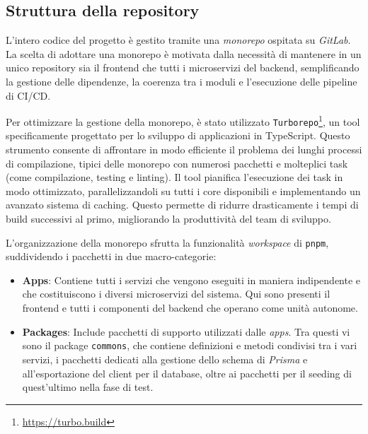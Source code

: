 \subsection{Struttura della repository}
L'intero codice del progetto è gestito tramite una \textit{monorepo} ospitata su \textit{GitLab}. La scelta di adottare una monorepo è motivata dalla necessità di mantenere in un unico repository sia il frontend che tutti i microservizi del backend, semplificando la gestione delle dipendenze, la coerenza tra i moduli e l'esecuzione delle pipeline di CI/CD.

Per ottimizzare la gestione della monorepo, è stato utilizzato \texttt{Turborepo}\footnote{\url{https://turbo.build}}, un tool specificamente progettato per lo sviluppo di applicazioni in TypeScript. Questo strumento consente di affrontare in modo efficiente il problema dei lunghi processi di compilazione, tipici delle monorepo con numerosi pacchetti e molteplici task (come compilazione, testing e linting). Il tool pianifica l'esecuzione dei task in modo ottimizzato, parallelizzandoli su tutti i core disponibili e implementando un avanzato sistema di caching. Questo permette di ridurre drasticamente i tempi di build successivi al primo, migliorando la produttività del team di sviluppo.

L'organizzazione della monorepo sfrutta la funzionalità \textit{workspace} di \texttt{pnpm}, suddividendo i pacchetti in due macro-categorie:
\begin{itemize}
  \item \textbf{Apps}: Contiene tutti i servizi che vengono eseguiti in maniera indipendente e che costituiscono i diversi microservizi del sistema. Qui sono presenti il frontend e tutti i componenti del backend che operano come unità autonome.
  \item \textbf{Packages}: Include pacchetti di supporto utilizzati dalle \textit{apps}. Tra questi vi sono il package \texttt{commons}, che contiene definizioni e metodi condivisi tra i vari servizi, i pacchetti dedicati alla gestione dello schema di \textit{Prisma} e all'esportazione del client per il database, oltre ai pacchetti per il seeding di quest'ultimo nella fase di test.
\end{itemize}

